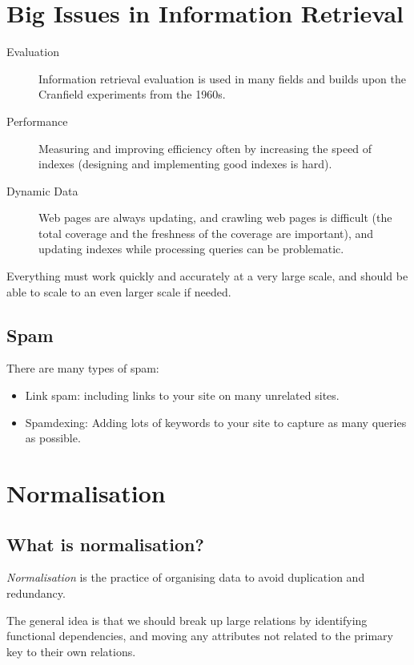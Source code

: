 \section{Big Issues in Information Retrieval}\label{sec:big_issues_in_information_retrieval}

\begin{description}
    \item[Evaluation] Information retrieval evaluation is used in many fields and builds upon the Cranfield experiments from the 1960s.
    \item[Performance] Measuring and improving efficiency often by increasing the speed of indexes (designing and implementing good indexes is hard).
    \item[Dynamic Data] Web pages are always updating, and crawling web pages is difficult (the total coverage and the freshness of the coverage are important), and updating indexes while processing queries can be problematic.
\end{description}
Everything must work quickly and accurately at a very large scale, and should be able to scale to an even larger scale if needed.

\subsection{Spam}\label{sub:dsrspam}

There are many types of spam:
\begin{itemize}
    \item Link spam: including links to your site on many unrelated sites.
    \item Spamdexing: Adding lots of keywords to your site to capture as many queries as possible.
\end{itemize}

\section{Normalisation}\label{sec:normalisation}

\subsection{What is normalisation?}\label{sub:what_is_normalisation_}

\emph{Normalisation} is the practice of organising data to avoid duplication and redundancy.

The general idea is that we should break up large relations by identifying functional dependencies, and moving any attributes not related to the primary key to their own relations.

